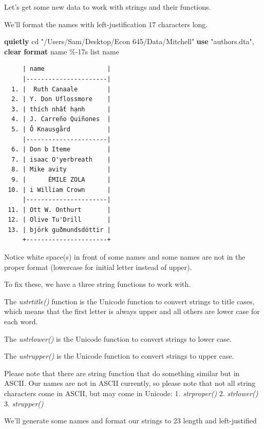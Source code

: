 \documentclass[
]{book}
\newenvironment{Shaded}{\begin{snugshade}}{\end{snugshade}}
\newcommand{\BaseNTok}[1]{\textcolor[rgb]{0.00,0.00,0.81}{#1}}
\newcommand{\KeywordTok}[1]{\textcolor[rgb]{0.13,0.29,0.53}{\textbf{#1}}}
\newcommand{\NormalTok}[1]{#1}
\newcommand{\OtherTok}[1]{\textcolor[rgb]{0.56,0.35,0.01}{#1}}
\newcommand{\StringTok}[1]{\textcolor[rgb]{0.31,0.60,0.02}{#1}}
\begin{document}
Let's get some new data to work with strings and their functions.

We'll format the names with left-justification 17 characters long.

\begin{Shaded}
\begin{Highlighting}[]
\KeywordTok{quietly}\NormalTok{ cd }\StringTok{"/Users/Sam/Desktop/Econ 645/Data/Mitchell"}
\KeywordTok{use} \StringTok{"authors.dta"}\NormalTok{, }\KeywordTok{clear}    
\KeywordTok{format} \BaseNTok{name}\NormalTok{ \%{-}17s}
\OtherTok{list} \BaseNTok{name} 
\end{Highlighting}
\end{Shaded}

\begin{verbatim}
     | name                 |
     |----------------------|
  1. |  Ruth Canaale        |
  2. | Y. Don Uflossmore    |
  3. | thích nhất hạnh      |
  4. | J. Carreño Quiñones  |
  5. | Ô Knausgård          |
     |----------------------|
  6. | Don b Iteme          |
  7. | isaac O'yerbreath    |
  8. | Mike avity           |
  9. |      ÉMILE ZOLA      |
 10. | i William Crown      |
     |----------------------|
 11. | Ott W. Onthurt       |
 12. | Olive Tu'Drill       |
 13. | björk guðmundsdóttir |
     +----------------------+
\end{verbatim}

Notice white space(s) in front of some names and some names are not in the proper format (lowercase for initial letter instead of upper).

To fix these, we have a three string functions to work with.

The \emph{ustrtitle()} function is the Unicode function to convert strings to title cases, which means that the first letter is always upper and all others are lower case for each word.

The \emph{ustrlower()} is the Unicode function to convert strings to lower case.

The \emph{ustrupper()} is the Unicode function to convert strings to upper case.

Please note that there are string function that do something similar but in ASCII. Our names are not in ASCII currently, so please note that not all string characters come in ASCII, but may come in Unicode:
1. \emph{strproper()}
2. \emph{strlower()}
3. \emph{strupper()}

We'll generate some names and format our strings to 23 length and left-justified
\end{document}
